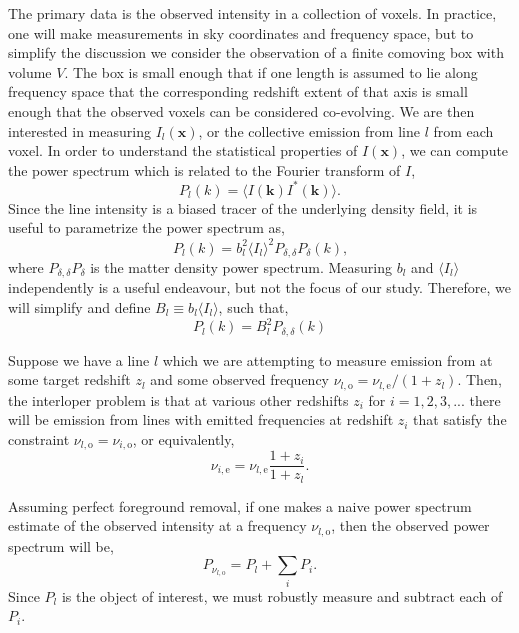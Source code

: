 \documentclass{aastex62}
\newcommand{\beq}{\begin{equation}}
\newcommand{\eeq}{\end{equation}}
\newcommand{\mynu}[2]{\ensuremath{\nu_{#1,\text{#2}}}}
\newcommand{\denps}{\ensuremath{P_{\delta,\delta}}}
\newcommand{\avg}[1]{\ensuremath{\langle #1 \rangle}}
\begin{document}
The primary data is the observed intensity in a collection of voxels. In
practice, one will make measurements in sky coordinates and frequency space,
but to simplify the discussion we consider the observation of a finite
comoving box with volume $V$. The box is small enough that if one length is
assumed to lie along frequency space that the corresponding redshift extent of
that axis is small enough that the observed voxels can be considered
co-evolving. We are then interested in measuring $I_{l}(\bm{x})$, or the
collective emission from line $l$ from each voxel. In order to understand the
statistical properties of $I(\bm{x})$, we can compute the power spectrum which
is related to the Fourier transform of $I$,
\beq
P_{l}(k) = \avg{I(\bm{k}) I^{*}(\bm{k})}\text{.}
\eeq
Since the line intensity is a biased tracer of the underlying density field,
it is useful to parametrize the power spectrum as,
\beq
P_l(k) = b_l^2 \avg{I_l}^2 \denps{P_{\delta}}(k)\text{,}
\eeq
where $\denps{P_{\delta}}$ is the matter density power spectrum. Measuring
$b_l$ and $\avg{I_l}$ independently is a useful endeavour, but not the focus
of our study. Therefore, we will simplify and define $B_l \equiv b_l
\avg{I_l}$, such that,
\beq
P_{l}(k) = B_l^2 \denps(k)
\eeq

Suppose we have a line $l$ which we are attempting to measure emission from at
some target redshift $z_l$ and some observed frequency $\mynu{l}{o} =
\mynu{l}{e}/(1+z_l)$. Then, the interloper problem is that at various other
redshifts $z_i$ for $i=1,2,3,...$ there will be emission from lines with
emitted frequencies at redshift $z_i$ that satisfy the constraint $\mynu{l}{o}
= \mynu{i}{o}$, or equivalently,
\beq
\mynu{i}{e} = \mynu{l}{e}\frac{1+z_i}{1+z_l}\text{.}
\eeq

Assuming perfect foreground removal, if one makes a naive power spectrum
estimate of the observed intensity at a frequency $\mynu{l}{o}$, then the
observed power spectrum will be,
\beq\label{eq:observed_with_int}
P_{\mynu{l}{o}} = P_{l} + \sum_{i} P_{i}\text{.}
\eeq
Since $P_l$ is the object of interest, we must robustly measure and subtract
each of $P_i$.
\end{document}

